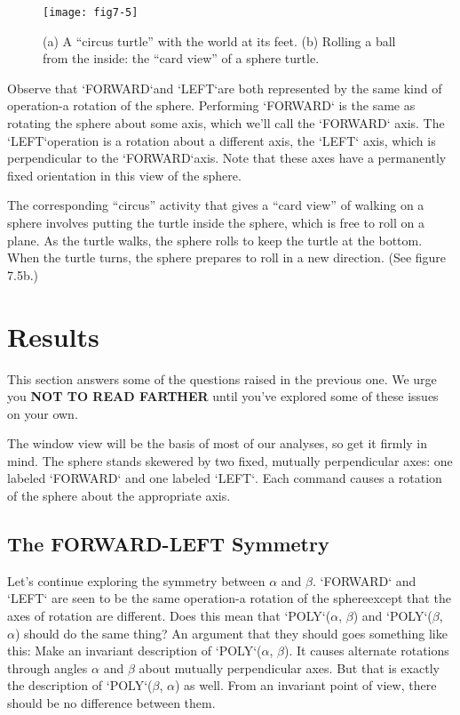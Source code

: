 \documentclass{book}
\begin{document}
\begin{figure}
\begin{center}
\texttt{[image: fig7-5]}
\caption{(a) A ``circus turtle'' with the world at its feet. (b) Rolling a ball from the inside: the ``card view'' of a sphere turtle.}
\end{center}
\end{figure}

Observe that \textsc{`FORWARD`}and \textsc{`LEFT`}are both represented by the same kind
of operation-a rotation of the sphere. Performing \textsc{`FORWARD`} is the same
as rotating the sphere about some axis, which we'll call the \textsc{`FORWARD`}
axis. The \textsc{`LEFT`}operation is a rotation about a different axis, the \textsc{`LEFT`}
axis, which is perpendicular to the \textsc{`FORWARD`}axis. Note that these axes
have a permanently fixed orientation in this view of the sphere.

The corresponding ``circus'' activity that gives a ``card view'' of walking on a sphere involves putting the turtle inside the sphere, which is
free to roll on a plane. As the turtle walks, the sphere rolls to keep the
turtle at the bottom. When the turtle turns, the sphere prepares to roll
in a new direction. (See figure 7.5b.)

\section{Results}

This section answers some of the questions raised in the previous one.
We urge you \textbf{NOT TO READ FARTHER} until you've explored some of
these issues on your own.

The window view will be the basis of most of our analyses, so get
it firmly in mind. The sphere stands skewered by two fixed, mutually
perpendicular axes: one labeled \textsc{`FORWARD`} and one labeled \textsc{`LEFT`}. Each
command causes a rotation of the sphere about the appropriate axis.

\subsection{The FORWARD-LEFT Symmetry}

Let's continue exploring the symmetry between $\alpha$ and $\beta$. \textsc{`FORWARD`} and
\textsc{`LEFT`} are seen to be the same operation-a rotation of the sphereexcept that the axes of rotation are different. Does this mean that
\textsc{`POLY`}($\alpha$, $\beta$) and \textsc{`POLY`}($\beta$, $\alpha$) should do the same thing? An argument
that they should goes something like this: Make an invariant description
of \textsc{`POLY`}($\alpha$, $\beta$). It causes alternate rotations through angles $\alpha$ and $\beta$
about mutually perpendicular axes. But that is exactly the description
of \textsc{`POLY`}($\beta$, $\alpha$) as well. From an invariant point of view, there should be
no difference between them.
\end{document}

